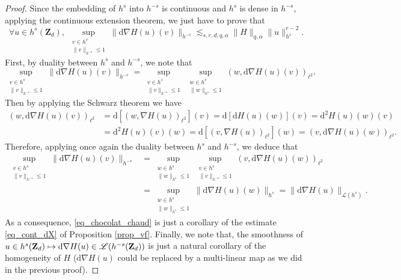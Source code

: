 \documentclass[JEP,XML,SOM,Unicode,NoEqCountersInSection,published]{cedram}
\newcommand\mto{\mathchoice{\longmapsto}{\mapsto}{\mapsto}{\mapsto}}
\theoremstyle{definition}
\begin{document}
\begin{proof}
Since the embedding of $h^s$ into $h^{-s}$ is continuous and $h^s$ is dense in $h^{-s}$, applying the continuous extension theorem, we just have to prove that
\begin{equation}
\label{eq_chocolat_chaud}
\forall u \in h^s(\mathbf{Z}_d), \ \sup_{\substack{v\in h^s \\ \| v\|_{h^{-s}}\leq 1}} \| \mathrm{d}\nabla H(u)(v) \|_{h^{-s}} \lesssim_{s,r,d,q,\alpha} \| H \|_{q,\alpha} \|u\|_{h^s}^{r-2}.
\end{equation}
First, by duality between $h^s$ and $h^{-s}$, we note that
\[
\sup_{\substack{v\in h^s \\ \| v\|_{h^{-s}}\leq 1}} \| \mathrm{d}\nabla H(u)(v) \|_{h^{-s}} = \sup_{\substack{v\in h^s \\ \| v\|_{h^{-s}}\leq 1}} \sup_{\substack{w\in h^s \\ \| w\|_{h^{s}}\leq 1}} (w, \mathrm{d} \nabla H(u)(v))_{\ell^2}.
\]
Then by applying the Schwarz theorem we have
\begin{align*}
(w, \mathrm{d} \nabla H(u)(v))_{\ell^2} &= \mathrm{d}[(w,\nabla H(u))_{\ell^2}](v) = \mathrm{d}[\mathrm{d} H(u)(w)](v) = \mathrm{d}^2 H(u)(w)(v) \\
&= \mathrm{d}^2 H(u)(v)(w) = \mathrm{d}[(v, \nabla H(u))_{\ell^2}](w) = (v, \mathrm{d} \nabla H(u)(w))_{\ell^2}.
\end{align*}
Therefore, applying once again the duality between $h^s$ and $h^{-s}$, we deduce that
\begin{equation*}
\begin{split}
\sup_{\substack{v\in h^s \\ \| v\|_{h^{-s}}\leq 1}} \| \mathrm{d} \nabla H(u)(v) \|_{h^{-s}} &= \! \! \sup_{\substack{w\in h^s \\ \| w\|_{h^{s}}\leq 1}} \sup_{\substack{v\in h^s \\ \| v\|_{h^{-s}}\leq 1}} (v, \mathrm{d} \nabla H(u)(w))_{\ell^2} \\ &= \! \! \sup_{\substack{w\in h^s \\ \| w\|_{h^{s}}\leq 1}} \| \mathrm{d} \nabla H(u)(w) \|_{h^{s}}
= \|\mathrm{d} \nabla H(u)\|_{\mathscr{L}(h^s)}.
\end{split}
\end{equation*}
As a consequence, \eqref{eq_chocolat_chaud} is just a corollary of the estimate \eqref{eq_cont_dX} of Proposition \ref{prop_vf}. Finally, we note that, the smoothness of $u\in h^s(\mathbf{Z}_d) \mto \mathrm{d}\nabla H(u) \in \mathscr{L}(h^{-s}(\mathbf{Z}_d))$ is just a natural corollary of the homogeneity of $H$ (\ie $\mathrm{d}\nabla H(u)$ could be replaced by a multi-linear map as we did in the previous proof).
\end{proof}
\end{document}
